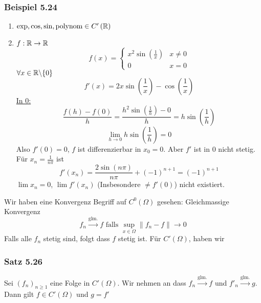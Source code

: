 \subsubsection*{Beispiel 5.24}
\begin{enumerate}
\item $\exp,\cos,\sin,\text{polynom}\in C'\left( \mathbb{R}\right)$
\item $f:\mathbb{R}\to\mathbb{R}$ 
\[f\left( x \right) = \left\{ {\begin{array}{*{20}{c}}
{{x^2}\sin \left( {\frac{1}{x}} \right)}&{x\not  = 0}\\
0&{x = 0}
\end{array}} \right.\]
$\forall x\in\mathbb{R}\backslash\{ 0\}$
\[f'\left( x \right) = 2x\sin \left( {\frac{1}{x}} \right) - \cos \left( {\frac{1}{x}} \right)\]
\underline{In 0:}
\[\frac{{f\left( h \right) - f\left( 0 \right)}}{h} = \frac{{{h^2}\sin \left( {\frac{1}{h}} \right) - 0}}{h} = h\sin \left( {\frac{1}{h}} \right)\]
\[\mathop {\lim }\limits_{h \to 0} h\sin \left( {\frac{1}{h}} \right) = 0\]
Also $f'(0)=0$, $f$ ist differenzierbar in $x_0=0$. Aber $f'$ ist in 0 nicht stetig. Für $x_n=\frac{1}{n\pi}$ ist 
\[f'\left( {{x_n}} \right) = \frac{{2\sin \left( {n\pi } \right)}}{{n\pi }} + {\left( { - 1} \right)^{n + 1}} = {\left( { - 1} \right)^{n + 1}}\]
$\lim x_n=0$, $\lim f'\left( x_n\right)$ (Insbesondere $\not=f'(0)$) nicht existiert.
\end{enumerate}
Wir haben eine Konvergenz Begriff auf $C^0\left( \Omega\right)$ gesehen: Gleichmassige Konvergenz 
\[{f_n}\mathop  \to \limits^{\text{glm.}} f{\text{ falls }}\mathop {\sup }\limits_{x \in \Omega } \left\| {{f_n} - f} \right\| \to 0\]
Falls alle $f_n$ stetig sind, folgt dass $f$ stetig ist. Für $C'\left( \Omega\right)$, haben wir

\subsubsection*{Satz 5.26}
Sei $\left( f_n\right)_{n\geq 1}$ eine Folge in $C'\left( \Omega\right)$. Wir nehmen an dass ${f_n}\mathop  \to \limits^{\text{glm.}} f$ und ${f'_n}\mathop  \to \limits^{\text{glm.}} g$. Dann gilt $f\in C'\left( \Omega\right)$ und $g=f'$

